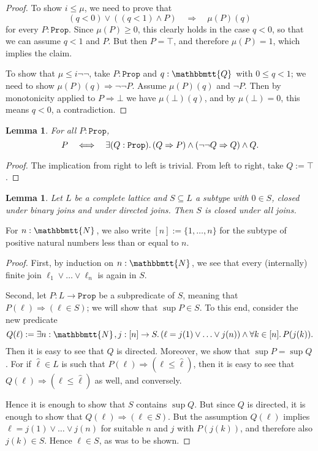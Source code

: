 \documentclass[11pt, oneside, article]{memoir}
\theoremstyle{plain}
\newtheorem{lemma}[theorem]{Lemma}
\theoremstyle{definition}
\theoremstyle{remark}
\newcommand{\const}[1]{\mathtt{#1}}
\newcommand{\internal}[1]{\raisebox{-.03ex}{$\mathbbmtt{#1}$}}
\newcommand{\hs}{\hspace{1.1pt}}
\newcommand{\tNN}{\internal{N}\hs}
\newcommand{\tQQ}{\internal{Q}\hs}
\newcommand{\Prop}{\const{Prop}}
\newcommand{\imp}{\Rightarrow}
\begin{document}
\begin{proof}
To show $i\leq\mu$, we need to prove that
\[
	(q < 0) \lor ( (q < 1) \land P) \quad \Longrightarrow \quad \mu(P)(q)
\]
for every $P : \Prop$. Since $\mu(P) \geq 0$, this clearly holds in the case $q < 0$, so that we can assume $q < 1$ and $P$. But then $P = \top$, and therefore $\mu(P) = 1$, which implies the claim.

To show that $\mu\leq i\neg\neg$, take $P:\Prop$ and $q:\tQQ$ with $0\leq q < 1$; we need to show $\mu(P)(q)\imp\neg\neg P$. Assume $\mu(P)(q)$ and $\neg P$. Then by monotonicity applied to $P \imp \bot$ we have $\mu(\bot)(q)$, and by $\mu(\bot)=0$, this means $q<0$, a contradiction.
\end{proof}

\begin{lemma}
\label{lem.regularly_based}
For all $P : \Prop$,
\[
	P \quad \Longleftrightarrow \quad \exists(Q:\Prop)\ldotp (Q\imp P)\wedge(\neg\neg Q\imp Q)\wedge Q.
\]
\end{lemma}

\begin{proof}
	The implication from right to left is trivial. From left to right, take $Q := \top$.
\end{proof}

\begin{lemma}
	\label{lem.sup_vs_directed}
	Let $L$ be a complete lattice and $S\subseteq L$ a subtype with $0\in S$, closed under binary joins and under directed joins. Then $S$ is closed under all joins.
\end{lemma}

For $n : \tNN$, we also write $[n] := \{1,\ldots,n\}$ for the subtype of positive natural numbers less than or equal to $n$.

\begin{proof}
	First, by induction on $n : \tNN$, we see that every (internally) finite join $\ell_1 \lor \ldots \lor \ell_n$ is again in $S$.

	Second, let $P : L \to \Prop$ be a subpredicate of $S$, meaning that $P(\ell) \imp (\ell \in S)$; we will show that $\sup P \in S$. To this end, consider the new predicate
	\[
		Q(\ell) := \exists n : \tNN, j : [n] \to S \ldotp \left( \ell = j(1) \lor \ldots \lor j(n) \right) \land \forall k \in [n]\ldotp P(j(k)).
	\]
	Then it is easy to see that $Q$ is directed. Moreover, we show that $\sup P = \sup Q$. For if $\hat{\ell} \in L$ is such that $P(\ell) \imp (\ell \leq \hat{\ell})$, then it is easy to see that $Q(\ell) \imp (\ell \leq \hat{\ell})$ as well, and conversely.

	Hence it is enough to show that $S$ contains $\sup Q$. But since $Q$ is directed, it is enough to show that $Q(\ell) \imp (\ell \in S)$. But the assumption $Q(\ell)$ implies $\ell = j(1) \lor \ldots \lor j(n)$ for suitable $n$ and $j$ with $P(j(k))$, and therefore also $j(k) \in S$. Hence $\ell \in S$, as was to be shown.
\end{proof}
\end{document}
